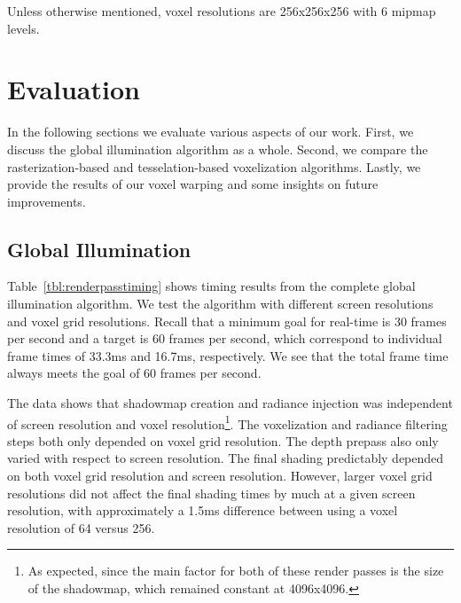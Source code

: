 Unless otherwise mentioned, voxel resolutions are 256x256x256 with 6 mipmap levels.

\section{Evaluation}
In the following sections we evaluate various aspects of our work. First, we discuss the global illumination algorithm as a whole. Second, we compare the rasterization-based and tesselation-based voxelization algorithms. Lastly, we provide the results of our voxel warping and some insights on future improvements.

\subsection{Global Illumination}
Table~\ref{tbl:renderpasstiming} shows timing results from the complete global illumination algorithm. We test the algorithm with different screen resolutions and voxel grid resolutions. Recall that a minimum goal for real-time is 30 frames per second and a target is 60 frames per second, which correspond to individual frame times of 33.3ms and 16.7ms, respectively. We see that the total frame time always meets the goal of 60 frames per second.

The data shows that shadowmap creation and radiance injection was independent of screen resolution and voxel resolution\footnote{As expected, since the main factor for both of these render passes is the size of the shadowmap, which remained constant at 4096x4096.}. The voxelization and radiance filtering steps both only depended on voxel grid resolution. The depth prepass also only varied with respect to screen resolution. The final shading predictably depended on both voxel grid resolution and screen resolution. However, larger voxel grid resolutions did not affect the final shading times by much at a given screen resolution, with approximately a 1.5ms difference between using a voxel resolution of 64 versus 256.

